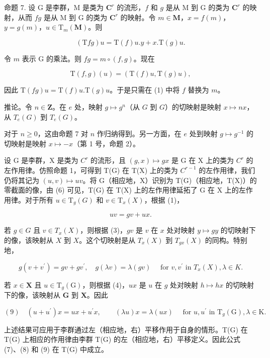 命题 7. 设 G 是李群，M 是类为 \(\mathbf{C}^r\) 的流形，\(f\) 和 \(g\) 是从 M 到 G 的类为 \(\mathbf{C}^r\) 的映射，从而 \(fg\) 是从 M 到 G 的类为 \(\mathbf{C}^r\) 的映射。令 \(m \in \mathbf{M}\)，\(x = f(m)\)，\(y = g(m)\)，\(u \in \mathrm{T}_m(\mathbf{M})\)。则

\[
(\mathrm{T} f g) u = \mathrm{T} (f) u. y + x. \mathrm{T} (g) u.
\]

令 \(m\) 表示 G 的乘法。则 \(fg = m \circ (f, g)\)。现在

\[
\mathrm{T} (f, g) (u) = (\mathrm{T} (f) u, \mathrm{T} (g) u),
\]

因此 \(\mathrm{T}(fg)u = \mathrm{T}(f)u.\mathrm{T}(g)u\)。于是只需在 (1) 中将 \(f\) 替换为 \(m\)。

推论。令 \(n \in \mathbf{Z}\)。在 \(e\) 处，映射 \(g \mapsto g^n\)（从 \(G\) 到 \(G\)）的切映射是映射 \(x \mapsto nx\)，从 \(T_e(G)\) 到 \(T_e(G)\)。

对于 \(n \geqslant 0\)，这由命题 7 对 \(n\) 作归纳得到。另一方面，在 \(e\) 处到映射 \(g \mapsto g^{-1}\) 的切映射是映射 \(x \mapsto -x\)（第 1 号，命题 2）。

设 G 是李群，X 是类为 \(C^r\) 的流形，且 \((g, x) \mapsto gx\) 是 G 在 X 上的类为 \(C^r\) 的左作用律。仿照命题 1，可得到 T(G) 在 T(X) 上的类为 \(C^{r-1}\) 的左作用律，我们仍将其记为 \((u, v) \mapsto uv\)。将 G（相应地，X）识别为 T(G)（相应地，T(X)）的零截面的像，由 (6) 可见，T(G) 在 T(X) 上的左作用律延拓了 G 在 X 上的左作用律。对于所有 \(u \in \mathrm{T}_{g}(G)\) 和 \(v \in \mathrm{T}_{x}(X)\)，根据 (1)，

\[
u v = g v + u x.\tag{7}
\]

若 \(g \in G\) 且 \(v \in T_x(X)\)，则根据 (3)，\(gv\) 是 \(v\) 在 \(x\) 处对映射 \(y \mapsto gy\) 的切映射下的像，该映射从 \(X\) 到 \(X\)。这个切映射是从 \(T_x(X)\) 到 \(T_{gx}(X)\) 的同构。特别地，

\[
g (v + v ^ {\prime}) = g v + g v ^ {\prime}, \quad g (\lambda v) = \lambda (g v) \quad \text { for } v, v ^ {\prime} \text { in } T _ {x} (X), \lambda \in K.\tag{8}
\]

若 \(x \in \mathbf{X}\) 且 \(u \in \mathrm{T}_g(\mathrm{G})\)，则根据 (4)，\(ux\) 是 \(u\) 在 \(g\) 处对映射 \(h \mapsto hx\) 的切映射下的像，该映射从 \(\mathbf{G}\) 到 \(\mathbf{X}\)。因此

\[
(9) \quad (u + u ^ {\prime}) x = u x + u ^ {\prime} x, \qquad (\lambda u) x = \lambda (u x) \quad \text { for } u, u ^ {\prime} \text { in } \mathrm{T} _ {g} (\mathrm{G}), \lambda \in \mathrm{K}.
\]

上述结果可应用于李群通过左（相应地，右）平移作用于自身的情形。T(G) 在 T(G) 上相应的作用律由李群 T(G) 的左（相应地，右）平移定义。因此公式 (7)、(8) 和 (9) 在 T(G) 中成立。


